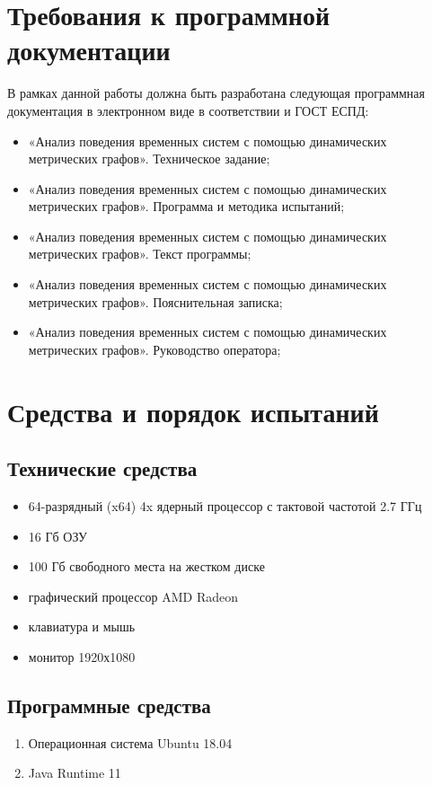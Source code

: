 \documentclass{../TechDoc}
\begin{document}
	\section{Требования к программной документации}
		В рамках данной работы должна быть разработана следующая программная документация в электронном виде в соответствии и ГОСТ ЕСПД:
	\begin{itemize}
		\item «Анализ поведения временных систем с помощью динамических метрических графов». Техническое задание\cite{TZbook};
		\item «Анализ поведения временных систем с помощью динамических метрических графов». Программа и методика испытаний\cite{TESTbook};
		\item «Анализ поведения временных систем с помощью динамических метрических графов». Текст программы\cite{SourceCodeBook};
		\item «Анализ поведения временных систем с помощью динамических метрических графов». Пояснительная записка\cite{PZbook};
		\item «Анализ поведения временных систем с помощью динамических метрических графов». Руководство оператора\cite{Operatorbook};
	\end{itemize}

	\section{Средства и порядок испытаний}
	\subsection{Технические средства}
	\begin{itemize}
		\item 64-разрядный (x64) 4x ядерный процессор с тактовой частотой 2.7 ГГц
		\item 16 Гб ОЗУ
		\item 100 Гб свободного места на жестком диске
		\item графический процессор AMD Radeon
		\item клавиатура и мышь
		\item монитор 1920х1080
	\end{itemize}
	
	\subsection{Программные средства}
	\begin{enumerate}
		\item Операционная система Ubuntu 18.04
		\item Java Runtime 11
	\end{enumerate}
	
\end{document}
